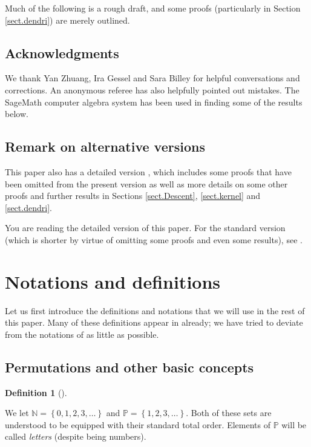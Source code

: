 \documentclass[numbers=enddot,12pt,final,onecolumn,notitlepage]{scrartcl}%
\theoremstyle{definition}
\newtheorem{defi}[theo]{Definition}
\newenvironment{definition}[1][]
{\begin{defi}[#1]\begin{leftbar}}
{\end{leftbar}\end{defi}}
\newenvironment{verlong}{}{}
\newenvironment{vershort}{}{}
\newenvironment{noncompile}{}{}
\begin{document}
\begin{noncompile}
Much of the following is a rough draft, and some proofs (particularly in
Section \ref{sect.dendri}) are merely outlined.
\end{noncompile}

\subsection*{Acknowledgments}

We thank Yan Zhuang, Ira Gessel and Sara Billey for helpful conversations and
corrections. An anonymous referee has also helpfully pointed out mistakes.
The SageMath computer algebra system \cite{SageMath} has been
used in finding some of the results below.

\subsection{Remark on alternative versions}

\begin{vershort}
This paper also has a detailed version \cite{verlong}, which includes some
proofs that have been omitted from the present version as well as more details
on some other proofs and further results in Sections \ref{sect.Descent},
\ref{sect.kernel} and \ref{sect.dendri}.
\end{vershort}

\begin{verlong}
You are reading the detailed version of this paper. For the standard version
(which is shorter by virtue of omitting some proofs and even some results),
see \cite{vershort}.
\end{verlong}

\section{\label{sect.notations}Notations and definitions}

Let us first introduce the definitions and notations that we will use in the
rest of this paper. Many of these definitions appear in \cite{part1} already;
we have tried to deviate from the notations of \cite{part1} as little as possible.

\subsection{Permutations and other basic concepts}

\begin{definition}
We let $\mathbb{N}=\left\{  0,1,2,3,\ldots\right\}  $ and $\mathbb{P}=\left\{
1,2,3,\ldots\right\}  $. Both of these sets are understood to be equipped with
their standard total order.
Elements of $\mathbb{P}$ will be called \textit{letters} (despite being
numbers).
\end{definition}
\end{document}
